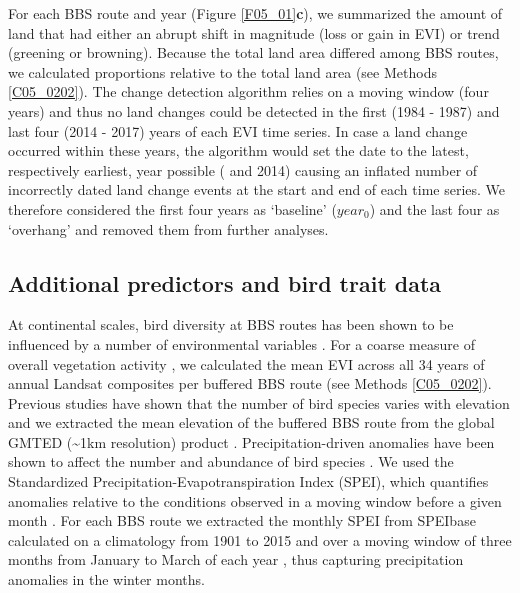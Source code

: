 For each BBS route and year (Figure \ref{F05_01}\textbf{c}), we summarized the amount of land that had either an abrupt shift in magnitude (loss or gain in EVI) or trend (greening or browning). Because the total land area differed among BBS routes, we calculated proportions relative to the total land area (see Methods \ref{C05_0202}). The change detection algorithm relies on a moving window (four years) and thus no land changes could be detected in the first (1984 - 1987) and last four (2014 - 2017) years of each EVI time series. In case a land change occurred within these years, the algorithm would set the date to the latest, respectively earliest, year possible ( and 2014) causing an inflated number of incorrectly dated land change events at the start and end of each time series. We therefore considered the first four years as ‘baseline’ ($year_0$) and the last four as ‘overhang’ and removed them from further analyses. 

\subsection{Additional predictors and bird trait data}
\label{C05_0204}

At continental scales, bird diversity at BBS routes has been shown to be influenced by a number of environmental variables \citep{Rowhani2008,Goetz2014,Hobi2017,Barnagaud2017}. For a coarse measure of overall vegetation activity \citep{Rowhani2008,Hobi2017}, we calculated the mean EVI across all 34 years of annual Landsat composites per buffered BBS route (see Methods \ref{C05_0202}). Previous studies have shown that the number of bird species varies with elevation \citep{Jarzyna2017} and we extracted the mean     elevation of the buffered BBS route from the global GMTED (\textasciitilde 1km resolution) product \citep{Danielson2011}. Precipitation-driven anomalies have been shown to affect the number and abundance of bird species \citep{Barnagaud2017}. We used the Standardized Precipitation-Evapotranspiration Index (SPEI), which quantifies anomalies relative to the conditions observed in a moving window before a given month \citep{Vicente-Serrano2010,Vicente-Serrano2012}. For each BBS route we extracted the monthly SPEI from SPEIbase \citep[ver. 2.5, \href{http://spei.csic.es}{http://spei.csic.es}, ][]{Vicente-Serrano2010} calculated on a climatology from 1901 to 2015 and over a moving window of three   months from January to March of each year \citep{Vicente-Serrano2010}, thus capturing precipitation anomalies in the winter months.

